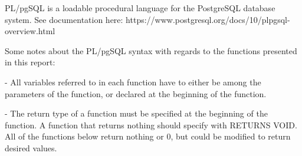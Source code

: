PL/pgSQL is a loadable procedural language for the PostgreSQL database system. See documentation here: https://www.postgresql.org/docs/10/plpgsql-overview.html

Some notes about the PL/pgSQL syntax with regards to the functions presented in this report:

- All variables referred to in each function have to either be among the parameters of the function, or declared at the beginning of the function.

- The return type of a function must be specified at the beginning of the function. A function that returns nothing should specify with RETURNS VOID.  All of the functions below return nothing or 0, but could be modified to return desired values. 